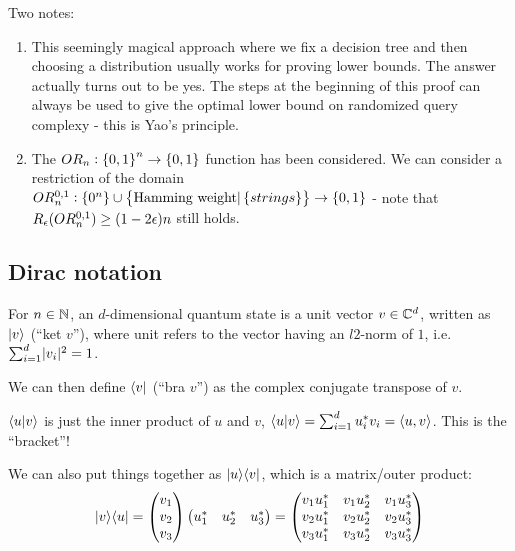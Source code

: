 Two notes:
\begin{enumerate}
    \item This seemingly magical approach where we fix a decision tree and then choosing a distribution usually works for proving lower bounds. The answer actually turns out to be yes.  The steps at the beginning of this proof can always be used to give the optimal lower bound on randomized query complexy - this is Yao's principle.
    \item The $OR_n: \set{0, 1}^n \to \set{0, 1}$ function has been considered. We can consider a restriction of the domain $OR_n^{0, 1}: \set{0^n} \cup \set{\text{Hamming weight} \vert \set{strings}} \to \set{0, 1}$ - note that $R_\epsilon(OR_n^{0, 1}) \geq (1-2\epsilon)n$ still holds.
\end{enumerate}

\subsection*{Dirac notation}
For $n \in \mathbb{N}$, an $d$-dimensional quantum state is a unit vector $v \in \mathbb{C}^d$, written as $\lvert v \rangle$ (``ket $v$''), where unit refers to the vector having an $l2$-norm of $1$, i.e. $\sum_{i=1}^d \lvert v_i \rvert^2 = 1$. 

We can then define $\langle v \rvert$ (``bra $v$'') as the complex conjugate transpose of $v$. 

$\langle u \lvert v \rangle$ is just the inner product of $u$ and $v$, $\langle u \lvert v \rangle = \sum_{i=1}^d u^*_i v_i = \langle u, v \rangle$. This is the ``bracket''!

We can also put things together as $\lvert u \rangle \langle v \rvert$, which is a matrix/outer product:
\begin{equation}
    \lvert v \rangle \langle u \rvert = \begin{pmatrix}v_1 \\ v_2 \\ v_3\end{pmatrix}\begin{pmatrix}u_1^* & u_2^* & u_3^*\end{pmatrix} = \begin{pmatrix}v_1u_1^* & v_1u_2^* & v_1u_3^* \\ v_2u_1^* & v_2u_2^* & v_2u_3^* \\ v_3u_1^* & v_3u_2^* & v_3u_3^*\end{pmatrix}
\end{equation}

